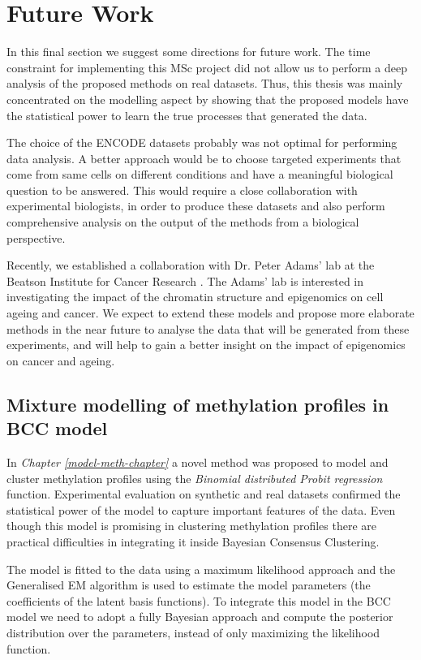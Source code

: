 \section{Future Work} \label{future-work-sect}
In this final section we suggest some directions for future work. The time constraint for implementing this MSc project did not allow us to perform a deep analysis of the proposed methods on real datasets. Thus, this thesis was mainly concentrated on the modelling aspect by showing that the proposed models have the statistical power to learn the true processes that generated the data.

The choice of the ENCODE datasets probably was not optimal for performing data analysis. A better approach would be to choose targeted experiments that come from same cells on different conditions and have a meaningful biological question to be answered. This would require a close collaboration with experimental biologists, in order to produce these datasets and also perform comprehensive analysis on the output of the methods from a biological perspective. 

Recently, we established a collaboration with Dr. Peter Adams' lab at the Beatson Institute for Cancer Research \citep{Adams2015}. The Adams' lab is interested in investigating the impact of the chromatin structure and epigenomics on cell ageing and cancer. We expect to extend these models and propose more elaborate methods in the near future to analyse the data that will be generated from these experiments, and will help to gain a better insight on the impact of epigenomics on cancer and ageing.     

\subsection{Mixture modelling of methylation profiles in BCC model} \label{conc-meth-prof-bcc-subsect}
In \emph{Chapter \ref{model-meth-chapter}} a novel method was proposed to model and cluster methylation profiles using the \emph{Binomial distributed Probit regression} function. Experimental evaluation on synthetic and real datasets confirmed the statistical power of the model to capture important features of the data. Even though this model is promising in clustering methylation profiles there are practical difficulties in integrating it inside Bayesian Consensus Clustering. 

The model is fitted to the data using a maximum likelihood approach and the Generalised EM algorithm is used to estimate the model parameters (\ie the coefficients of the latent basis functions). To integrate this model in the BCC model we need to adopt a fully Bayesian approach and compute the posterior distribution over the parameters, instead of only maximizing the likelihood function.

